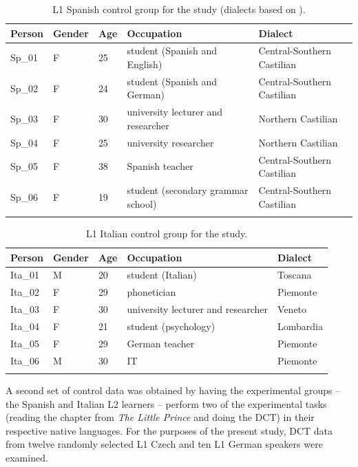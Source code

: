 \begin{table}[p]
\begin{tabularx}{\textwidth}{lllQQ}
\lsptoprule
{Person} & {Gender} & {Age} & {Occupation} & {Dialect}\\
\midrule
Sp\_01 & F & 25 & student (Spanish and English) & Central-Southern Castilian\\
Sp\_02 & F & 24 & student (Spanish and German) & Central-Southern Castilian\\
Sp\_03 & F & 30 & university lecturer and researcher & Northern Castilian\\
Sp\_04 & F & 25 & university researcher & Northern Castilian\\
Sp\_05 & F & 38 & Spanish teacher & Central-Southern Castilian\\
Sp\_06 & F & 19 & student (secondary grammar school) & Central-Southern Castilian\\
\lspbottomrule
\end{tabularx}

\caption{\label{tab:3.8}L1 Spanish control group for the study (dialects based on \citealt{Hualde2005}).}
\end{table}

\begin{table}[p]
\begin{tabularx}{\textwidth}{lllQl}
\lsptoprule
{Person} & {Gender} & {Age} & {Occupation} & {Dialect}\\
\midrule
Ita\_01 & M & 20 & student (Italian) & Toscana\\
Ita\_02 & F & 29 & phonetician & Piemonte\\
Ita\_03 & F & 30 & university lecturer and researcher & Veneto\\
Ita\_04 & F & 21 & student (psychology) & Lombardia\\
Ita\_05 & F & 29 & German teacher & Piemonte\\
Ita\_06 & M & 30 & IT & Piemonte\\
\lspbottomrule
\end{tabularx}

\caption{\label{tab:3.9}L1 Italian control group for the study.}
\end{table}\clearpage


A second set of control data was obtained by having the experimental groups -- the Spanish and Italian L2 learners -- perform two of the experimental tasks (reading the chapter from \textit{The Little Prince} and doing the DCT) in their respective native languages. For the purposes of the present study, DCT data from twelve randomly selected L1 Czech and ten L1 German speakers were examined.


